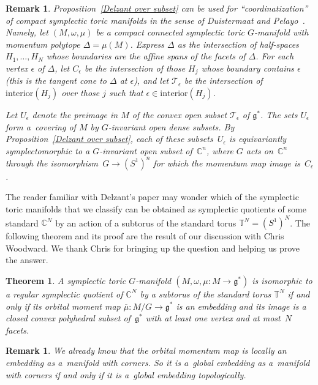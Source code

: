 \documentclass[pdftex]{sigma}
\numberwithin{equation}{section}
\newtheorem{Theorem}[Lemma]{Theorem}
\newtheorem{Remark}[Lemma]{Remark}
\begin{document}
\begin{Remark}
  Proposition~\ref{Delzant over subset} can be used for
  ``coordinatization'' of compact symplectic toric manifolds in the
  sense of Duistermaat and Pelayo~\cite{DP}. Namely, let
  $(M,\omega,\mu)$ be a compact connected symplectic toric
  $G$-manifold with momentum polytope $\Delta = \mu(M)$.  Express
  $\Delta$ as the intersection of half-spaces $H_1,\ldots,H_N$ whose
  boundaries are the af\/f\/ine spans of the facets of $\Delta$.  For each
  vertex $\epsilon$ of $\Delta$, let $C_\epsilon$ be the intersection of those
  $H_j$ whose boundary contains $\epsilon$ (this is the tangent cone to
  $\Delta$ at $\epsilon$), and let ${\mathcal T}_\epsilon$ be the intersection of
  $\text{interior}(H_j)$ over those $j$ such that $\epsilon \in
  \text{interior}(H_j)$.

Let $U_\epsilon$ denote the preimage in $M$ of the convex open subset
${\mathcal T}_\epsilon$ of ${\mathfrak g}^*$.
The sets $U_\epsilon$ form a~covering of $M$ by $G$-invariant open dense subsets.
By Proposition~\ref{Delzant over subset},
each of these sub\-sets~$U_\epsilon$ is equivariantly symplectomorphic
to a $G$-invariant open subset of~${\mathbb C}^n$,
where $G$ acts on~${\mathbb C}^n$ through the isomorphism~$G \to (S^1)^n$
for which the momentum map image is~$C_\epsilon$.
\end{Remark}

The reader familiar with Delzant's paper may wonder which of the
symplectic toric manifolds that we classify can be obtained as
symplectic quotients of some standard ${\mathbb C}^N$ by an action of a
subtorus of the standard torus ${\mathbb T}^N = (S^1)^N$.
The following theorem and its proof are the result of our discussion
with Chris Woodward.  We thank Chris for bringing up the question
and helping us prove the answer.

\begin{Theorem} \label{reduction of CN}
  A symplectic toric $G$-manifold $(M,\omega,\mu \colon M\to {\mathfrak g}^*)$ is
  isomorphic to a regular symplectic quotient of ${\mathbb C}^N$ by a subtorus of the
  standard torus ${\mathbb T}^N$ if and only if
  its orbital moment map $\overline{\mu} \colon M/G \to {\mathfrak g}^*$
  is an embedding and its image is a closed convex
  polyhedral subset of~${\mathfrak g}^*$ with at least one vertex
  and at most~$N$  facets.
\end{Theorem}

\begin{Remark}
We already know that the orbital momentum map is locally
an embedding as a~manifold with corners.
So it is a~global embedding as a~manifold with corners
if and only if it is a~global embedding topologically.
\end{Remark}
\end{document}
